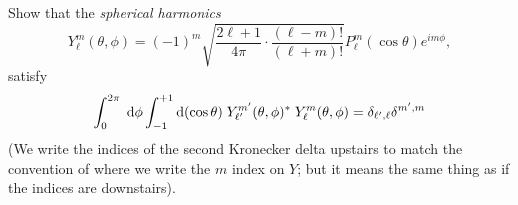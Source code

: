 \documentclass[answers]{exam}\newcommand{\repositoryInformationSetup}{     \usepackage[dvipsnames]{xcolor}     \usepackage[ angle=90, color=black, opacity=1, scale=2, ]{background}      \SetBgPosition{current page.west}      \SetBgVshift{-4.5mm}      \backgroundsetup{contents={{\color{green}\texttt{-{}-} differs from commit \texttt{f3526e2} in 0 files}}} } \newcommand{\commit}{{{\color{green}f3526e2}}}\usepackage{amsmath}
\providecommand{\id}{}
\renewcommand{\id}[1]{\ensuremath{\; \mathrm{d}#1}}
\begin{document}
\begin{questions}
\begin{parts}
		Show that the \emph{spherical harmonics}
		\begin{equation}
			Y_\ell^m(\theta,\phi) = (-1)^m \sqrt{\frac{2\ell+1}{4\pi} \cdot \frac{(\ell-m)!}{(\ell+m)!}} P_\ell^m(\cos\theta) e^{i m \phi},
		\end{equation}
		satisfy
		\begin{equation}
			\int_0^{2\pi} \id{\phi} \int_{-1}^{+1} {\rm d}(\cos\theta)\; Y_{\ell'}^{m'}(\theta,\phi)^*\; Y_{\ell}^{m}(\theta,\phi) =
			\delta_{\ell',\ell}\delta^{m',m}
		\end{equation}
		(We write the indices of the second Kronecker delta upstairs to match the convention of where we write the $m$ index on $Y$; but it means the same thing as if the indices are downstairs).
		\begin{solution}\end{solution}




\end{parts}
\end{questions}
\end{document}
